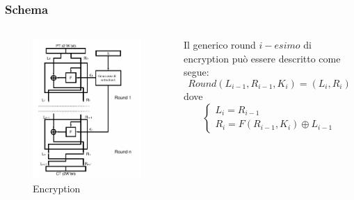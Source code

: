 	\begin{frame}
		\frametitle{Schema}
		\begin{columns}
			\begin{column}{0.4\textwidth}
				\begin{center}
					\begin{figure}
						\includegraphics[width=\columnwidth]{img/feistel1}
						\caption{Encryption}			
					\end{figure}
				\end{center}
			\end{column}
			\begin{column}{0.7\textwidth}
				Il generico round $i-esimo$ di encryption può essere descritto come segue:
				$$Round(L_{i-1},R_{i-1},K_i) = (L_i,R_i)$$dove$$
				\begin{cases}
				L_i = R_{i-1} \\
				R_i = F(R_{i-1},K_i) \oplus L_{i-1}
				\end{cases}$$
			\end{column}
		\end{columns}
	\end{frame}

